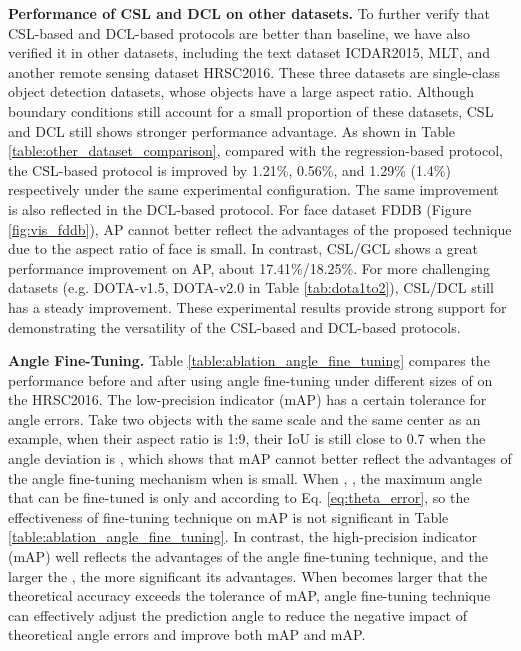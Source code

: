 \documentclass[10pt,journal,compsoc]{IEEEtran}
\begin{document}
\noindent \textbf{Performance of CSL and DCL on other datasets.}
To further verify that CSL-based and DCL-based protocols are better than baseline, we have also verified it in other datasets, including the text dataset ICDAR2015, MLT, and another remote sensing dataset HRSC2016. These three datasets are single-class object detection datasets, whose objects have a large aspect ratio. Although boundary conditions still account for a small proportion of these datasets, CSL and DCL still shows stronger performance advantage. As shown in Table \ref{table:other_dataset_comparison}, compared with the regression-based protocol, the CSL-based protocol is improved by 1.21\%, 0.56\%, and 1.29\% (1.4\%) respectively under the same experimental configuration. The same improvement is also reflected in the DCL-based protocol.
For face dataset FDDB (Figure \ref{fig:vis_fddb}), AP cannot better reflect the advantages of the proposed technique due to the aspect ratio of face is small. In contrast, CSL/GCL shows a great performance improvement on AP, about 17.41\%/18.25\%.
For more challenging datasets (e.g. DOTA-v1.5, DOTA-v2.0 in Table \ref{tab:dota1to2}), CSL/DCL still has a steady improvement.
These experimental results provide strong support for demonstrating the versatility of the CSL-based and DCL-based protocols.

\noindent \textbf{Angle Fine-Tuning.}
Table \ref{table:ablation_angle_fine_tuning} compares the performance before and after using angle fine-tuning under different sizes of  on the HRSC2016.
The low-precision indicator (mAP) has a certain tolerance for angle errors.
Take two objects with the same scale and the same center as an example, when their aspect ratio is 1:9, their IoU is still close to 0.7 when the angle deviation is , which shows that mAP cannot better reflect the advantages of the angle fine-tuning mechanism when  is small.
When , , the maximum angle that can be fine-tuned is only  and  according to Eq. \ref{eq:theta_error}, so the effectiveness of fine-tuning technique on mAP is not significant in Table \ref{table:ablation_angle_fine_tuning}. In contrast, the high-precision indicator (mAP) well reflects the advantages of the angle fine-tuning technique, and the larger the , the more significant its advantages. When  becomes larger that the theoretical accuracy exceeds the tolerance of mAP, angle fine-tuning technique can effectively adjust the prediction angle to reduce the negative impact of theoretical angle errors and improve both mAP and mAP.
\end{document}
